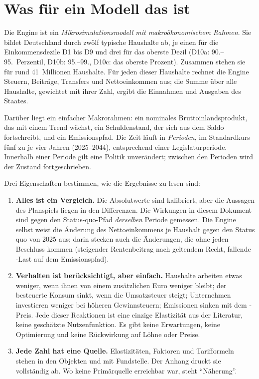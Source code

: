 
\section{Was für ein Modell das ist}

Die Engine ist ein \emph{Mikrosimulationsmodell mit makroökonomischem Rahmen}. Sie bildet
Deutschland durch zwölf typische Haushalte ab, je einen für die Einkommensdezile D1 bis D9 und
drei für das oberste Dezil (D10a: 90.--95.~Perzentil, D10b: 95.--99., D10c: das oberste
Prozent). Zusammen stehen sie für rund 41~Millionen Haushalte. Für jeden dieser Haushalte
rechnet die Engine Steuern, Beiträge, Transfers und Nettoeinkommen aus; die Summe über alle
Haushalte, gewichtet mit ihrer Zahl, ergibt die Einnahmen und Ausgaben des Staates.

Darüber liegt ein einfacher Makrorahmen: ein nominales Bruttoinlandsprodukt, das mit einem
Trend wächst, ein Schuldenstand, der sich aus dem Saldo fortschreibt, und ein
Emissionspfad. Die Zeit läuft in \emph{Perioden}, im Standardkurs fünf zu je vier Jahren
(2025--2044), entsprechend einer Legislaturperiode. Innerhalb einer Periode gilt eine Politik
unverändert; zwischen den Perioden wird der Zustand fortgeschrieben.

Drei Eigenschaften bestimmen, wie die Ergebnisse zu lesen sind:

\begin{enumerate}
\item \textbf{Alles ist ein Vergleich.} Die Absolutwerte sind kalibriert, aber die Aussagen
  des Planspiels liegen in den Differenzen. Die Wirkungen in diesem Dokument sind gegen den
  Status-quo-Pfad \emph{derselben} Periode gemessen. Die Engine selbst weist die Änderung des
  Nettoeinkommens je Haushalt gegen den Status quo von 2025 aus; darin stecken auch die
  Änderungen, die ohne jeden Beschluss kommen (steigender Rentenbeitrag nach geltendem Recht,
  fallende \COz-Last auf dem Emissionspfad).
\item \textbf{Verhalten ist berücksichtigt, aber einfach.} Haushalte arbeiten etwas weniger,
  wenn ihnen von einem zusätzlichen Euro weniger bleibt; der besteuerte Konsum sinkt, wenn die
  Umsatzsteuer steigt; Unternehmen investieren weniger bei höheren Gewinnsteuern; Emissionen
  sinken mit dem \COz-Preis. Jede dieser Reaktionen ist eine einzige Elastizität aus der
  Literatur, keine geschätzte Nutzenfunktion. Es gibt keine Erwartungen, keine Optimierung
  und keine Rückwirkung auf Löhne oder Preise.
\item \textbf{Jede Zahl hat eine Quelle.} Elastizitäten, Faktoren und Tarifformeln stehen in
  den Objekten  und  mit Fundstelle. Der Anhang
  druckt sie vollständig ab. Wo keine Primärquelle erreichbar war, steht \enquote{Näherung}.
\end{enumerate}

